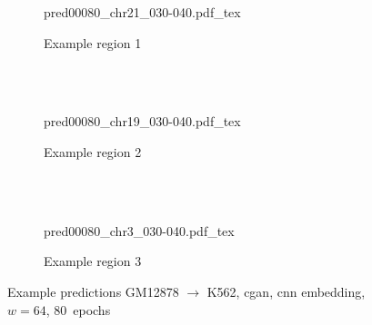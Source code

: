 \begin{figure}[p] %
    \begin{subfigure}{\textwidth}
        \centering
        \scriptsize
        {pred00080_chr21_030-040.pdf_tex}
        \caption{Example  region 1} \label{fig:results:cGAN64_r1}
    \end{subfigure}\\[2mm]
    \\[3mm]
    \begin{subfigure}{\textwidth}
        \centering
        \scriptsize
        {pred00080_chr19_030-040.pdf_tex}
        \caption{Example region 2} \label{fig:results:cGAN64_r2}
    \end{subfigure}\\[2mm]
    \\[3mm]
    \begin{subfigure}{\textwidth}
        \centering
        \scriptsize
        {pred00080_chr3_030-040.pdf_tex}
        \caption{Example region 3} \label{fig:results:cGAN64_r3}
    \end{subfigure}
    \caption{Example predictions GM12878 $\rightarrow$ K562, \acrshort{cgan}, \acrshort{cnn} embedding, $w=64$, 80~epochs}
\end{figure} \label{fig:results:cGAN64_matrices}


